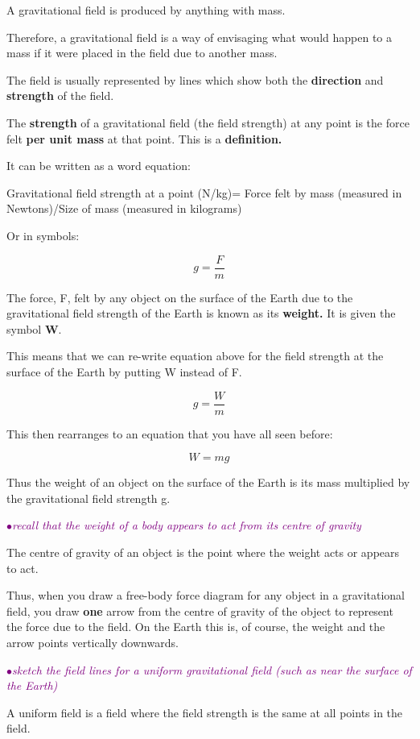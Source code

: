 \documentclass[a4paper,11pt,twoside]{memoir}
\newcounter{spec}[chapter]
\newcommand{\spec}[1]{\Needspace{5\baselineskip}\textcolor{purple}{$\bullet$\hspace{0.5cm}\textit{#1}}}
\begin{document}
A gravitational field is produced by anything with mass.

Therefore, a gravitational field is a way of envisaging what would
happen to a mass if it were placed in the field due to another mass.

The field is usually represented by lines which show both the
\textbf{direction} and \textbf{strength} of the field.

The \textbf{strength} of a gravitational field (the field strength) at
any point is the force felt \textbf{per unit mass} at that point. This
is a \textbf{definition.}

It can be written as a word equation:

Gravitational field strength at a point (N/kg)= Force felt by mass (measured
in Newtons)/Size of mass (measured in kilograms)

Or in symbols:

\[g = \frac{F}{m} \]

The force, F, felt by any object on the surface of the Earth due to the
gravitational field strength of the Earth is known as its
\textbf{weight.} It is given the symbol \textbf{W}.

This means that we can re-write equation above for the field strength at
the surface of the Earth by putting W instead of F.

\[g = \frac{W}{m}\]

This then rearranges to an equation that you have all seen before:

\[W = mg\]

Thus the weight of an object on the surface of the Earth is its mass
multiplied by the gravitational field strength g.

\spec{recall that the weight of a body appears to act from its centre of gravity}

The centre of gravity of an object is the point where the weight acts or
appears to act.

Thus, when you draw a free-body force diagram for any object in a
gravitational field, you draw \textbf{one} arrow from the centre of
gravity of the object to represent the force due to the field. On the
Earth this is, of course, the weight and the arrow points vertically
downwards.

\spec{sketch the field lines for a uniform gravitational field (such as near the surface of the Earth)}

A uniform field is a field where the field strength is the same at all
points in the field.
\end{document}

